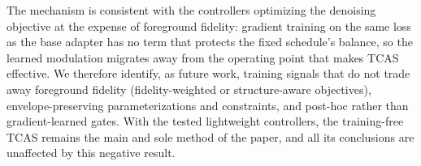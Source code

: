 \documentclass[10pt]{article}
\begin{document}
The mechanism is consistent with the controllers optimizing the denoising objective at the expense of foreground fidelity: gradient training on the same loss as the base adapter has no term that protects the fixed schedule's balance, so the learned modulation migrates away from the operating point that makes TCAS effective. We therefore identify, as future work, training signals that do not trade away foreground fidelity (fidelity-weighted or structure-aware objectives), envelope-preserving parameterizations and constraints, and post-hoc rather than gradient-learned gates. With the tested lightweight controllers, the training-free TCAS remains the main and sole method of the paper, and all its conclusions are unaffected by this negative result.
\end{document}
